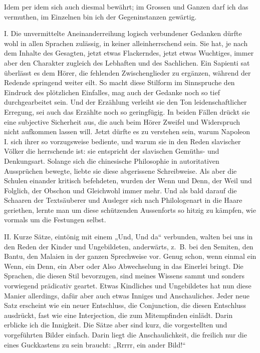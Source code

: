 Idem per idem sich auch diesmal bewährt; im Grossen und Ganzen darf ich das vermuthen, im Einzelnen bin ich der Gegeninstanzen gewärtig.

I. Die unvermittelte Aneinanderreihung logisch verbundener Gedanken dürfte wohl in allen Sprachen zulässig, in keiner alleinherrschend sein. Sie hat, je nach dem Inhalte des Gesagten, jetzt etwas Flackerndes, jetzt etwas Wuchtiges, immer aber den Charakter zugleich des Lebhaften und des Sachlichen. Ein Sapienti sat überlässt es dem Hörer, die fehlenden Zwischenglieder zu ergänzen, während der Redende springend weiter eilt. So macht diese Stilform im Sinn\label{sp.465}spruche den Eindruck des plötzlichen Einfalles, mag auch der Gedanke noch so tief durchgearbeitet sein. Und der Erzählung verleiht sie den Ton leidenschaftlicher Erregung, sei auch das Erzählte noch so geringfügig. In beiden Fällen drückt sie eine subjective Sicherheit aus, die auch beim Hörer Zweifel und Widerspruch nicht aufkommen lassen will. Jetzt dürfte es zu verstehen sein, warum Napoleon I. sich ihrer so vorzugsweise bediente, und warum sie in den Reden slavischer Völker die herrschende ist: sie entspricht der slavischen Gemüths- und Denkungsart. Solange sich die chinesische Philosophie in autoritativen Aussprüchen bewegte, liebte sie diese abgerissene Schreibweise. Als aber die Schulen einander kritisch befehdeten, wurden der Wenn und Denn, der Weil und Folglich, der Obschon und Gleichwohl immer mehr. Und als bald darauf die Schaaren der Textsäuberer und Ausleger sich nach Philologenart in die Haare geriethen, lernte man um diese schützenden Aussenforts so hitzig zu kämpfen, wie vormals um die Festungen selbst.

II. Kurze Sätze, eintönig mit einem „Und, Und da“ verbunden, walten bei uns in den Reden der Kinder und Ungebildeten, anderwärts, z.~B. bei den Semiten, den Bantu, den Malaien in der ganzen Sprechweise vor. Genug schon, wenn einmal ein Wenn, ein Denn, ein Aber oder Also Abwechselung in das Einerlei bringt. Die Sprachen, die diesen Stil bevorzugen, sind meines Wissens sammt und sonders vorwiegend prädicativ geartet. Etwas Kindliches und Ungebildetes hat nun diese Manier allerdings, dafür aber auch etwas Inniges und Anschauliches. Jeder neue Satz erscheint wie ein neuer Entschluss, die Conjunction, die diesen Entschluss ausdrückt, fast wie eine Interjection, die zum Mitempfinden einlädt. Darin erblicke ich die Innigkeit. Die Sätze aber sind kurz, die vorgestellten und vorgeführten Bilder einfach. Darin liegt \label{fp.446} die Anschaulichkeit, die freilich nur die eines Guckkastens zu sein braucht: „Rrrrr, ein ander Bild!“

